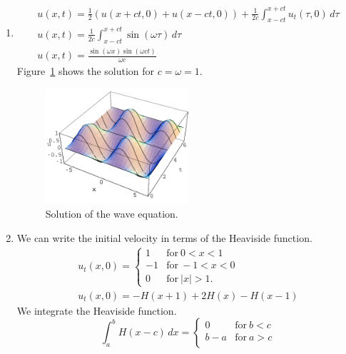 {%
\begin{Solution}
  \begin{enumerate}
  \item
    \begin{gather*}
      u(x,t) = \frac{1}{2} \left( u(x+ct,0) + u(x-ct,0)\right) + 
      \frac{1}{2c} \int_{x-ct}^{x+ct} u_t(\tau,0) \,d\tau \\
      u(x,t) = \frac{1}{2c} \int_{x-ct}^{x+ct} \sin(\omega \tau) \,d\tau \\
      u(x,t) = \frac{ \sin(\omega x) \sin(\omega c t) }{ \omega c }
    \end{gather*}
    Figure~\ref{wave_ut_sin} shows the solution for $c = \omega = 1$.
    \begin{figure}[h!]
      \begin{center}
        \includegraphics[width=0.5\textwidth]{pde/waves/wave_ut_sin}
      \end{center}
      \caption{Solution of the wave equation.}
      \label{wave_ut_sin}
    \end{figure}
  \item
    We can write the initial velocity in terms of the Heaviside function.
    \begin{gather*}
      u_t(x,0) = 
      \begin{cases}
        1       &\mathrm{for}\ 0 < x < 1 \\
        -1      &\mathrm{for}\ -1 < x < 0 \\
        0       &\mathrm{for}\ |x|  > 1 .
      \end{cases} \\
      u_t(x,0) = -H(x+1) + 2 H(x) - H(x-1)
    \end{gather*}
    We integrate the Heaviside function.
    \[
    \int_a^b H(x-c) \,d x = 
    \begin{cases}
      0 &\mathrm{for}\ b < c \\
      b-a &\mathrm{for}\ a > c \\

\end{cases}\]
\end{enumerate}
\end{Solution}}
